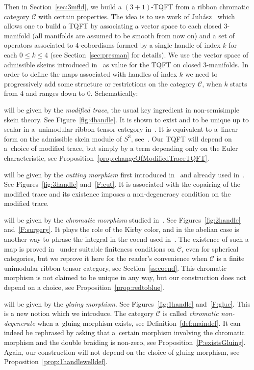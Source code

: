 \documentclass[pdftex]{sigma}
\numberwithin{equation}{section}
\numberwithin{theorem}{section}
\numberwithin{proposition}{section}
\numberwithin{definition}{section}
\numberwithin{lemma}{section}
\numberwithin{corollary}{section}
\numberwithin{remark}{section}
\numberwithin{example}{section}
\newcommand{\cat}{\mathcal{C}}
\begin{document}
 Then in Section~\ref{sec:3mfld}, we build a $(3+1)$-TQFT from
a ribbon chromatic category $\cat$ with certain properties.
The idea is to use work of Juh\'asz~\cite{Juh2018} which allows one to build a TQFT by associating a vector space to each closed $3$-manifold (all manifolds are
assumed to be
smooth from now on) and a set of operators associated to $4$-cobordisms formed by a single handle of index $k$ for each $0\leq k \leq 4$ (see Section~\ref{sec:presman} for details).
We use the vector space of admissible skeins introduced in~\cite{CGP22} as value for the TQFT on closed $3$-manifolds. In order to define the maps associated
with
 handles of index $k$ we need to progressively add some structure or restrictions on the category $\cat$, when $k$ starts from $4$ and ranges down to $0$. Schematically:
\begin{description}\itemsep=0pt
\item[The 4-handle] will be given by the \emph{modified trace}, the usual key ingredient in non-semisimple skein theory. See Figure~\ref{fig:4handle}. It is shown to exist and to be unique up to scalar in a~unimodular ribbon tensor category in~\cite[Corollary 5.6]{GKP22}. It is equivalent to a~linear form on the admissible skein module of $S^3$, see~\cite[Theorem~3.1]{CGP22}. Our TQFT will depend on a~choice of modified trace, but simply by a term depending only on the Euler characteristic, see Proposition~\ref{prop:changeOfModifiedTraceTQFT}.
\item[The 3-handle] will be given by the \emph{cutting morphism} first introduced in~\cite{CGPT20} and already used in~\cite{CGPV2023a}. See Figures~\ref{fig:3handle} and~\ref{F:cut}. It is associated with the copairing of the modified trace and its existence imposes a non-degeneracy condition on the modified trace.
\item[The 2-handle] will be given by the \emph{chromatic morphism} studied in~\cite{CGPV2023b}. See Figures~\ref{fig:2handle} and~\ref{F:surgery}. It plays the role of the Kirby color, and in the abelian case is another way to phrase the integral in the coend used in~\cite{DRGGPMR2022}. The existence of such a map is proved in~\cite{CGPV2023b} under suitable finiteness conditions on $\cat$, even for spherical categories, but we reprove it here for the reader's convenience when $\cat$ is a finite unimodular ribbon tensor category, see Section~\ref{ss:coend}. This chromatic morphism is not claimed to be unique in any way, but our construction does not depend on a choice, see Proposition~\ref{prop:redtoblue}.
\item[The 1-handle] will be given by the \emph{gluing morphism}. See Figures~\ref{fig:1handle} and~\ref{F:glue}. This is a new notion which we introduce. The category $\cat$ is called \emph{chromatic non-degenerate} when a~gluing morphism exists, see Definition~\ref{def:maindef}. It can indeed be rephrased by asking that a~certain morphism involving the chromatic morphism and the double braiding is non-zero, see Proposition~\ref{P:existsGluing}. Again, our construction will not depend on the choice of gluing morphism, see Proposition~\ref{prop:1handlewelldef}.

\end{description}
\end{document}

